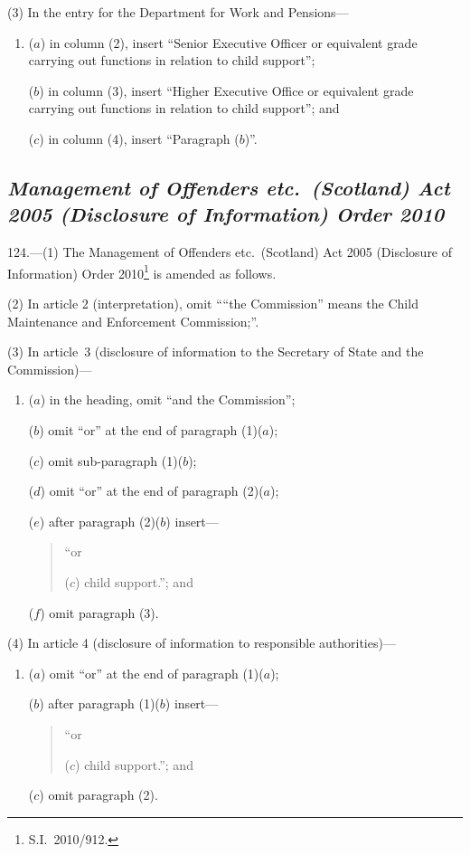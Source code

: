 \documentclass[12pt,a4paper]{article}
\begin{document}
(3) In the entry for the Department for Work and Pensions—
\begin{enumerate}\item[]
($a$) in column (2), insert “Senior Executive Officer or equivalent grade carrying out functions in relation to child support”;

($b$) in column (3), insert “Higher Executive Office or equivalent grade carrying out functions in relation to child support”; and

($c$) in column (4), insert “Paragraph ($b$)”.
\end{enumerate}

\subsection*{\itshape
Management of Offenders etc.\ (Scotland) Act 2005 (Disclosure of Information) Order 2010
}

124.---(1)  The Management of Offenders etc.\ (Scotland) Act 2005 (Disclosure of Information) Order 2010\footnote{S.I.~2010/912.} is amended as follows.

(2) In article 2 (interpretation), omit ““the Commission” means the Child Maintenance and Enforcement Commission;”.

(3) In article~3 (disclosure of information to the Secretary of State and the Commission)—
\begin{enumerate}\item[]
($a$) in the heading, omit “and the Commission”;

($b$) omit “or” at the end of paragraph (1)($a$);

($c$) omit sub-paragraph (1)($b$);

($d$) omit “or” at the end of paragraph (2)($a$);

($e$) after paragraph (2)($b$)  insert—
\begin{quotation}
“or

($c$) child support.”; and
\end{quotation}

($f$) omit paragraph (3).
\end{enumerate}

(4) In article 4 (disclosure of information to responsible authorities)—
\begin{enumerate}\item[]
($a$) omit “or” at the end of paragraph (1)($a$);

($b$) after paragraph (1)($b$)  insert—
\begin{quotation}
“or

($c$) child support.”; and
\end{quotation}

($c$) omit paragraph (2).
\end{enumerate}
\end{document}
